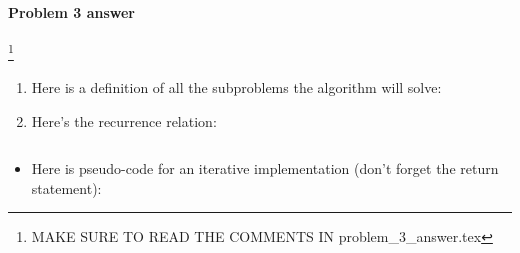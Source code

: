 \paragraph{Problem 3 answer}\footnote
{\color{red} MAKE SURE TO READ THE COMMENTS IN problem\_3\_answer.tex}

\begin{enumerate}

\item[(a)] Here is a definition of all the subproblems the algorithm will solve:

  \begin{blue}

    \REPLACEME 
    


  \end{blue}
  
\item[(b)] Here's the recurrence relation:

  \begin{blue}

    \REPLACEME 


    \[
    \]

  \end{blue}
\end{enumerate}  

\begin{itemize}
\item[(c)]  Here is pseudo-code for an iterative implementation (don't forget the return statement):
\end{itemize}

